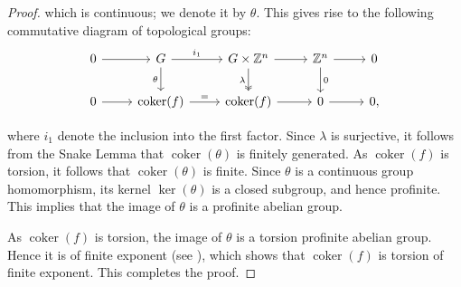 \documentclass[12pt]{amsart}
\theoremstyle{remark}
\renewcommand{\1}{{\mathbb{S}}}
\newcommand{\<}{\langle}
\renewcommand{\>}{\rangle}
\newcommand{\cok}{{\operatorname{coker}}}
\begin{document}
\begin{proof}
which is continuous; we denote it by $\theta$. This gives rise to the following commutative diagram of topological groups:
\[
\begin{tikzcd}
0 \arrow[r] & G \arrow[r, "i_{1}"] \arrow[d, "\theta"'] & G \times \mathbb{Z}^{n} \arrow[r] \arrow[d, two heads, "\lambda"'] & \mathbb{Z}^{n} \arrow[r] \arrow[d, "0"] & 0 \\
0 \arrow[r] & \cok(f) \arrow[r, "="] & \cok(f) \arrow[r] & 0 \arrow[r] & 0,
\end{tikzcd}
\] 

where $i_{1}$ denote the inclusion into the first factor. Since $\lambda$ is surjective, it follows from the Snake Lemma that $\cok(\theta)$ is finitely generated. As $\cok(f)$ is torsion, it follows that $\cok(\theta)$ is finite. Since $\theta$ is a continuous group homomorphism, its kernel $\ker(\theta)$ is a closed subgroup, and hence profinite. This implies that the image of $\theta$ is a profinite abelian group.

As $\cok(f)$ is torsion, the image of $\theta$ is a torsion profinite abelian group. Hence it is of finite exponent (see \cite[Lemma 4.3.7]{RZ}), which shows that $\cok(f)$ is torsion of finite exponent. This completes the proof.

 
 
 
 
\end{proof}
\end{document}

